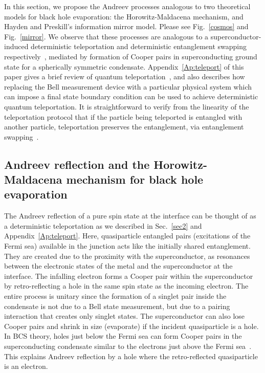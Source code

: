 \documentclass[10pt,letterpaper,aps,onecolumn,superscriptaddress,floatfix,notitlepage]{revtex4-1}
\begin{document}
	In this section, we propose the Andreev processes analogous to two theoretical models for black hole evaporation: the Horowitz-Maldacena mechanism, and Hayden and Preskill's information mirror model. Please see Fig.~\ref{cosmos} and Fig.~\ref{mirror}.       
	We observe that these processes are analogous to a superconductor-induced deterministic teleportation and deterministic entanglement swapping respectively~\cite{projection,niels,bennett1993teleporting,zukowski1993event}, mediated by formation of Cooper pairs in superconducting ground state for a spherically symmetric condensate. Appendix~\ref{Ap:teleport} of this paper gives a brief review of quantum teleportation~\cite{bennett1993teleporting}, and also describes how replacing the Bell measurement device with a particular physical system which can impose a final state boundary condition can be used to achieve deterministic quantum teleportation. It is straightforward to verify from the linearity of the teleportation protocol that if the particle being teleported is entangled with another particle, teleportation preserves the entanglement, via entanglement swapping~\cite{niels,zukowski1993event}.
	\subsection{Andreev reflection and the Horowitz-Maldacena mechanism for black hole evaporation}
	
	The Andreev reflection of a pure spin state at the interface can be thought of as a deterministic teleportation as we described in Sec.~\ref{sec2} and Appendix~\ref{Ap:teleport}.  Here, quasiparticle entangled pairs (excitations of the Fermi sea) available in the junction acts like the initially shared entanglement. They are created due to the proximity with the superconductor, as resonances between the electronic states of the metal and the superconductor at the interface.  The infalling electron forms a Cooper pair within the superconductor by retro-reflecting a hole in the same spin state as the incoming electron. The entire process is unitary since the formation of a singlet pair inside the condensate is not due to a Bell state measurement, but due to a pairing interaction that creates only singlet states. The superconductor can also lose Cooper pairs and shrink in size (evaporate) if the incident quasiparticle is a hole. In BCS theory, holes just below the Fermi sea can form Cooper pairs in the superconducting condensate similar to the electrons just above the Fermi sea~\cite{annett2004superconductivity}. This explains Andreev reflection by a hole where the retro-reflected quasiparticle is an electron.     
	
\end{document}
